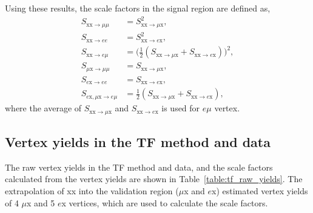 Using these results, the scale factors in the signal region are defined as,
\begin{align}
\label{eq:TF_scale_factors}
S_{\mathrm{xx} \rightarrow \mu\mu} &=  S_{\mathrm{xx} \rightarrow \mu \mathrm{x}}^{2},  \nonumber\\
S_{\mathrm{xx} \rightarrow ee} &= S_{\mathrm{xx} \rightarrow e\mathrm{x}}^{2},  \nonumber\\
S_{\mathrm{xx} \rightarrow e\mu} &= \Big(\frac{1}{2} (S_{\mathrm{xx} \rightarrow \mu \mathrm{x}} + S_{\mathrm{xx} \rightarrow e\mathrm{x}})\Big)^{2}, \nonumber\\
S_{\mu \mathrm{x} \rightarrow \mu\mu} &=  S_{\mathrm{xx} \rightarrow \mu \mathrm{x}},  \nonumber\\
S_{e \mathrm{x} \rightarrow ee} &= S_{\mathrm{xx} \rightarrow e\mathrm{x}},  \nonumber\\
S_{e \mathrm{x}, \mu \mathrm{x} \rightarrow e\mu} &= \frac{1}{2} (S_{\mathrm{xx} \rightarrow \mu \mathrm{x}} + S_{\mathrm{xx} \rightarrow e\mathrm{x}}),
\end{align}
where the average of $S_{\mathrm{xx} \rightarrow \mu \mathrm{x}}$ and $S_{\mathrm{xx} \rightarrow e \mathrm{x}}$ is used for $e \mu$ vertex.



\subsection{Vertex yields in the TF method and data}
\label{sec:tf_raw_yields}
The raw vertex yields in the TF method and data, and the scale factors calculated from the vertex yields are shown in Table~\ref{table:tf_raw_yields}. The extrapolation of xx into the validation region ($\mu$x and $e$x) estimated vertex yields of 4 $\mu$x and 5 $e$x vertices, which are used to calculate the scale factors.

